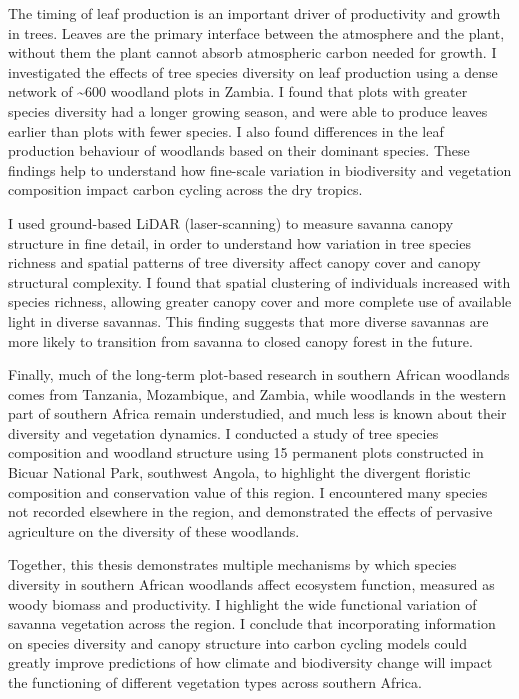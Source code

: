 The timing of leaf production is an important driver of productivity and growth in trees. Leaves are the primary interface between the atmosphere and the plant, without them the plant cannot absorb atmospheric carbon needed for growth. I investigated the effects of tree species diversity on leaf production using a dense network of \textasciitilde{}600 woodland plots in Zambia. I found that plots with greater species diversity had a longer growing season, and were able to produce leaves earlier than plots with fewer species. I also found differences in the leaf production behaviour of woodlands based on their dominant species. These findings help to understand how fine-scale variation in biodiversity and vegetation composition impact carbon cycling across the dry tropics.

I used ground-based LiDAR (laser-scanning) to measure savanna canopy structure in fine detail, in order to understand how variation in tree species richness and spatial patterns of tree diversity affect canopy cover and canopy structural complexity. I found that spatial clustering of individuals increased with species richness, allowing greater canopy cover and more complete use of available light in diverse savannas. This finding suggests that more diverse savannas are more likely to transition from savanna to closed canopy forest in the future.

Finally, much of the long-term plot-based research in southern African woodlands comes from Tanzania, Mozambique, and Zambia, while woodlands in the western part of southern Africa remain understudied, and much less is known about their diversity and vegetation dynamics. I conducted a study of tree species composition and woodland structure using 15 permanent plots constructed in Bicuar National Park, southwest Angola, to highlight the divergent floristic composition and conservation value of this region. I encountered many species not recorded elsewhere in the region, and demonstrated the effects of pervasive agriculture on the diversity of these woodlands. 

Together, this thesis demonstrates multiple mechanisms by which species diversity in southern African woodlands affect ecosystem function, measured as woody biomass and productivity. I highlight the wide functional variation of savanna vegetation across the region. I conclude that incorporating information on species diversity and canopy structure into carbon cycling models could greatly improve predictions of how climate and biodiversity change will impact the functioning of different vegetation types across southern Africa. 
